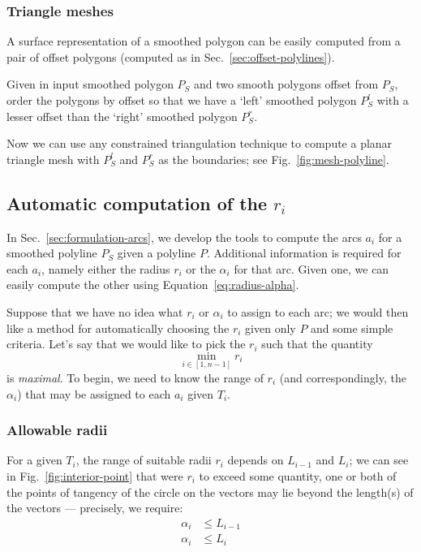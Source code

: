 \documentclass{article}
\begin{document}
\subsubsection{Triangle meshes}
%
A surface representation of a smoothed polygon can be easily computed from a pair of offset polygons (computed as in Sec.~\ref{sec:offset-polylines}).

Given in input smoothed polygon $P_S$ and two smooth polygons offset from $P_S$, order the polygons by offset so that we have a `left' smoothed polygon $P^l_S$ with a lesser offset than the `right' smoothed polygon $P^r_S$.

Now we can use any constrained triangulation technique to compute a planar triangle mesh with $P^l_S$ and $P^r_S$ as the boundaries; see Fig.~\ref{fig:mesh-polyline}.
%
\subsection{Automatic computation of the $r_i$}
%
In Sec.~\ref{sec:formulation-arcs}, we develop the tools to compute the arcs $a_{i}$ for a smoothed polyline $P_{S}$ given a polyline $P$.  Additional information is required for each $a_{i}$, namely either the radius $r_{i}$ or the $\alpha_i$ for that arc.  Given one, we can easily compute the other using Equation~\eqref{eq:radius-alpha}.

Suppose that we have no idea what $r_{i}$ or $\alpha_{i}$ to assign to each arc; we would then like a method for automatically choosing the $r_{i}$ given only $P$ and some simple criteria.  Let's say that we would like to pick the $r_{i}$ such that the quantity
%
\begin{equation}
  \label{eq:optimize-radius}
  \min_{i \in [1, n-1]} r_{i}
\end{equation}
%
is \emph{maximal}.  To begin, we need to know the range of $r_{i}$ (and correspondingly, the $\alpha_{i}$) that may be assigned to each $a_{i}$ given $T_{i}$.
%
\subsubsection{Allowable radii}
\label{sec:allowable-radii}
%
For a given $T_{i}$, the range of suitable radii $r_{i}$ depends on $L_{i-1}$ and $L_i$; we can see in Fig.~\ref{fig:interior-point} that were $r_{i}$ to exceed some quantity, one or both of the points of tangency of the circle on the vectors may lie beyond the length(s) of the vectors --- precisely, we require:
%
\begin{align}
  \label{eq:alphalimit-b}
  \alpha_i &\le L_{i-1}\\
  \label{eq:alphalimit-f}
  \alpha_i &\le L_{i}
\end{align}
%
\end{document}
